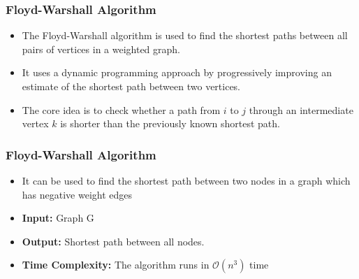 \documentclass[10pt,aspectratio=43]{beamer}
\begin{document}
\begin{frame}
    \frametitle{\textcolor{myMaroon}{Floyd-Warshall Algorithm}}
    \begin{itemize}
        \item The Floyd-Warshall algorithm is used to find the shortest paths between all pairs of vertices in a weighted graph.

        \vspace{0.4cm}
        \item It uses a dynamic programming approach by progressively improving an estimate of the shortest path between two vertices.

        \vspace{0.4cm}
        \item The core idea is to check whether a path from $i$ to $j$ through an intermediate vertex $k$ is shorter than the previously known shortest path.
    \end{itemize}
\end{frame}

\begin{frame}
    \frametitle{\textcolor{myMaroon}{Floyd-Warshall Algorithm}}
    \begin{itemize}
        \item It can be used to find the shortest path between two nodes in a graph which has negative weight edges

        \vspace{0.4cm}
        \item \textbf{Input: } Graph G

        \vspace{0.4cm}
        \item \textbf{Output: } Shortest path between all nodes.

        \vspace{0.4cm}
        \item \textbf{Time Complexity: } The algorithm runs in \textbf{$\mathcal{O}(n^3)$} time
    \end{itemize}
\end{frame}
\end{document}

